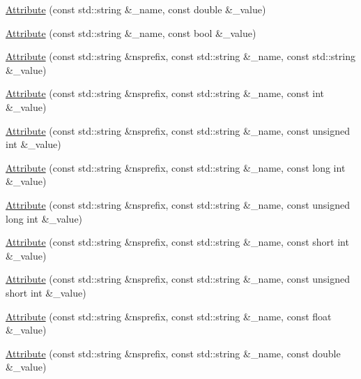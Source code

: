 \begin{DoxyCompactItemize}
\item 
\mbox{\hyperlink{classXMLWriterAPI_1_1Attribute_a48165cf6ffa29bc718542fdc81b98764}{Attribute}} (const std\+::string \&\+\_\+name, const double \&\+\_\+value)
\item 
\mbox{\hyperlink{classXMLWriterAPI_1_1Attribute_ad16e250869a26c1058a73cd9faef5d2f}{Attribute}} (const std\+::string \&\+\_\+name, const bool \&\+\_\+value)
\item 
\mbox{\hyperlink{classXMLWriterAPI_1_1Attribute_af62de63beb69186f082ce7f612514115}{Attribute}} (const std\+::string \&nsprefix, const std\+::string \&\+\_\+name, const std\+::string \&\+\_\+value)
\item 
\mbox{\hyperlink{classXMLWriterAPI_1_1Attribute_a9e412b0bd0a009de13ec17416e18e5b0}{Attribute}} (const std\+::string \&nsprefix, const std\+::string \&\+\_\+name, const int \&\+\_\+value)
\item 
\mbox{\hyperlink{classXMLWriterAPI_1_1Attribute_ab3fa4bff9a545a9ae37ea8abde138769}{Attribute}} (const std\+::string \&nsprefix, const std\+::string \&\+\_\+name, const unsigned int \&\+\_\+value)
\item 
\mbox{\hyperlink{classXMLWriterAPI_1_1Attribute_a3a90c7d66504a0d26098167ab29078f4}{Attribute}} (const std\+::string \&nsprefix, const std\+::string \&\+\_\+name, const long int \&\+\_\+value)
\item 
\mbox{\hyperlink{classXMLWriterAPI_1_1Attribute_a49838f6100d4c88ddca013872cfe0a1d}{Attribute}} (const std\+::string \&nsprefix, const std\+::string \&\+\_\+name, const unsigned long int \&\+\_\+value)
\item 
\mbox{\hyperlink{classXMLWriterAPI_1_1Attribute_a302d83b35d8e0ad1d36e6e98455e54b7}{Attribute}} (const std\+::string \&nsprefix, const std\+::string \&\+\_\+name, const short int \&\+\_\+value)
\item 
\mbox{\hyperlink{classXMLWriterAPI_1_1Attribute_a632d5cb11f50e03bf79b27fb97b132a4}{Attribute}} (const std\+::string \&nsprefix, const std\+::string \&\+\_\+name, const unsigned short int \&\+\_\+value)
\item 
\mbox{\hyperlink{classXMLWriterAPI_1_1Attribute_a0640c93b661665cb3ed185178bd69119}{Attribute}} (const std\+::string \&nsprefix, const std\+::string \&\+\_\+name, const float \&\+\_\+value)
\item 
\mbox{\hyperlink{classXMLWriterAPI_1_1Attribute_a501528e4f1a7b1cabeaf7cfc21c0b97d}{Attribute}} (const std\+::string \&nsprefix, const std\+::string \&\+\_\+name, const double \&\+\_\+value)
\item 

\end{DoxyCompactItemize}

